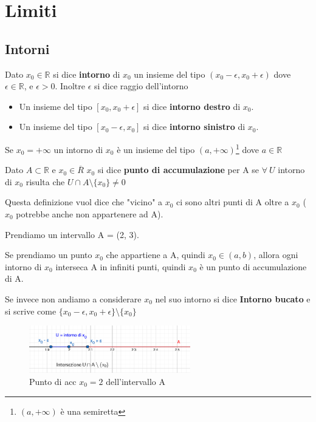 \newpage
\section{Limiti}
\subsection{Intorni}
\begin{definition}[Intorno]
    Dato $x_0 \in \mathbb{R}$ si dice \textbf{intorno} di $x_0$ un insieme del tipo $(x_0 - \epsilon, x_0 + \epsilon)$ dove $\epsilon \in \mathbb{R}$, e $\epsilon > 0$. Inoltre $\epsilon$ si dice raggio dell'intorno
\end{definition}
\begin{itemize}
    \item Un insieme del tipo $[x_0, x_0 + \epsilon]$ si dice \textbf{intorno destro} di $x_0$.
    \item Un insieme del tipo $[x_0 - \epsilon, x_0]$ si dice \textbf{intorno sinistro} di $x_0$.
\end{itemize}
\begin{definition}
    Se $x_0 = +\infty$ un intorno di $x_0$ è un insieme del tipo $(a, +\infty)$\footnote{$(a, +\infty)$ è una semiretta} dove $a \in \mathbb{R}$
\end{definition}
\begin{definition}
    Dato $A \subset \mathbb{R}$ e $x_0 \in \overline{R}$ $x_0$ si dice \textbf{punto di accumulazione} per A se $\forall \: U$ intorno di $x_0$ risulta che $U \cap A \setminus \{x_0\} \neq 0$
\end{definition}
Questa definizione vuol dice che "vicino" a $x_0$ ci sono altri punti di A oltre a $x_0$ ($x_0$ potrebbe anche non appartenere ad A).
\begin{example}
    Prendiamo un intervallo A = (2, 3).
\end{example}
Se prendiamo un punto $x_0$ che appartiene a A, quindi $x_0 \in (a,b)$, allora ogni intorno di $x_0$ interseca A in infiniti punti, quindi $x_0$ è un punto di accumulazione di A.\\
\begin{definition}
    Se invece non andiamo a considerare $x_0$ nel suo intorno si dice \textbf{Intorno bucato} e si scrive come $\{x_0 - \epsilon, x_0 + \epsilon\} \setminus \{x_0\}$
\end{definition}
\begin{figure}
    \centering
    \includegraphics[width=7cm]{images/esempio-intorno-su-estremi.png}
    \caption{Punto di acc $x_0 = 2$ dell'intervallo A}
\end{figure}

